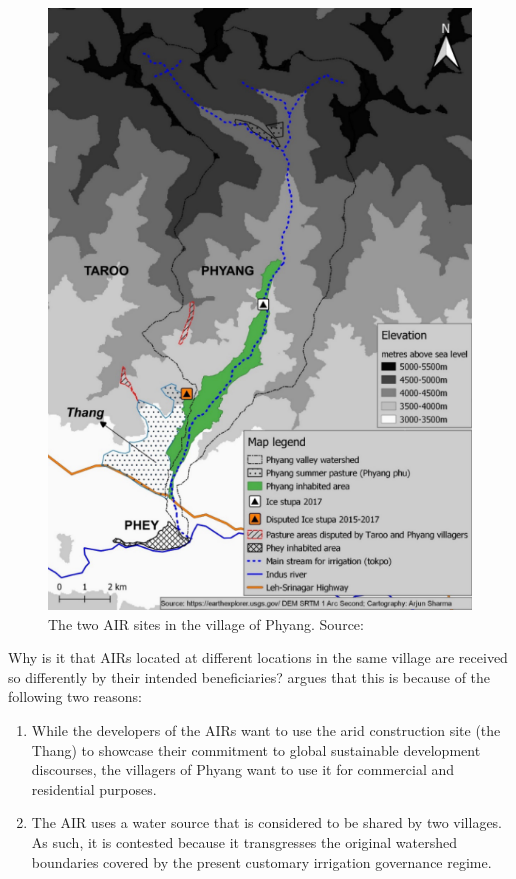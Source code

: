 \begin{figure}
	\includegraphics[width=\textwidth]{figs/sharma2019.png}

  \caption{The two AIR sites in the village of Phyang. Source: \citet{sharmaGivingWaterIts2019}}

	\label{fig:phyang}
\end{figure}

Why is it that AIRs located at different locations in the same village are received so differently by their
intended beneficiaries? \citet{sharmaGivingWaterIts2019} argues that this is because of the following two
reasons:
\begin{enumerate}
  \item While the developers of the AIRs want to use the arid construction site (the Thang) to showcase 
    their commitment to global sustainable development discourses, the villagers of Phyang want to use it 
    for commercial and residential purposes.
  \item The AIR uses a water source that is considered to be shared by two villages. As such, it is contested
    because it transgresses the original watershed boundaries covered by the present customary irrigation
    governance regime.
\end{enumerate}

